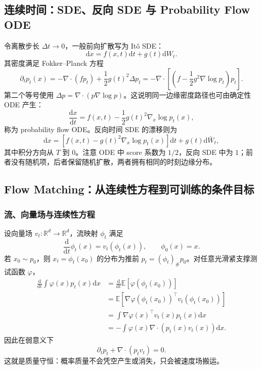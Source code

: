 \documentclass[11pt,a4paper]{ctexart}
\newcommand{\E}{\mathbb{E}}
\newcommand{\R}{\mathbb{R}}
\newcommand{\dd}{\mathrm{d}}
\begin{document}
\subsection{连续时间：SDE、反向 SDE 与 Probability Flow ODE}

令离散步长 $\Delta t\to0$，一般前向扩散写为 It\^o SDE：
\begin{equation}
\dd x=f(x,t)\dd t+g(t)\dd W_t.
\end{equation}
其密度满足 Fokker--Planck 方程
\begin{equation}
\partial_t p_t(x)=-\nabla\cdot(f p_t)+\frac12 g(t)^2\Delta p_t
=-\nabla\cdot\left[\left(f-\frac12g^2\nabla\log p_t\right)p_t\right].
\label{eq:fp}
\end{equation}
第二个等号使用 $\Delta p=\nabla\cdot(p\nabla\log p)$。这说明同一边缘密度路径也可由确定性 ODE 产生：
\begin{equation}
\frac{\dd x}{\dd t}=f(x,t)-\frac12g(t)^2\nabla_x\log p_t(x),
\end{equation}
称为 probability flow ODE。反向时间 SDE 的漂移则为
\begin{equation}
\dd x=\left[f(x,t)-g(t)^2\nabla_x\log p_t(x)\right]\dd t+g(t)\dd\bar W_t,
\end{equation}
其中积分方向从 $T$ 到 $0$。注意 ODE 中 score 系数为 $1/2$，反向 SDE 中为 $1$；前者没有随机项，后者保留随机扩散，两者拥有相同的时刻边缘分布。

\subsection{Flow Matching：从连续性方程到可训练的条件目标}

\subsubsection*{流、向量场与连续性方程}

设向量场 $v_t:\R^d\to\R^d$，流映射 $\phi_t$ 满足
\begin{equation}
\frac{\dd}{\dd t}\phi_t(x)=v_t(\phi_t(x)),\qquad\phi_0(x)=x.
\end{equation}
若 $x_0\sim p_0$，则 $x_t=\phi_t(x_0)$ 的分布为推前
$p_t=(\phi_t)_\#p_0$。对任意光滑紧支撑测试函数 $\varphi$，
\begin{align}
\frac{\dd}{\dd t}\int\varphi(x)p_t(x)\dd x
&=\frac{\dd}{\dd t}\E[\varphi(\phi_t(x_0))]\\
&=\E[\nabla\varphi(\phi_t(x_0))^\top v_t(\phi_t(x_0))]\\
&=\int\nabla\varphi(x)^\top v_t(x)p_t(x)\dd x\\
&=-\int\varphi(x)\nabla\cdot(p_t(x)v_t(x))\dd x.
\end{align}
因此在弱意义下
\begin{equation}
\partial_t p_t+\nabla\cdot(p_t v_t)=0.
\label{eq:continuity}
\end{equation}
这就是质量守恒：概率质量不会凭空产生或消失，只会被速度场搬运。
\end{document}
